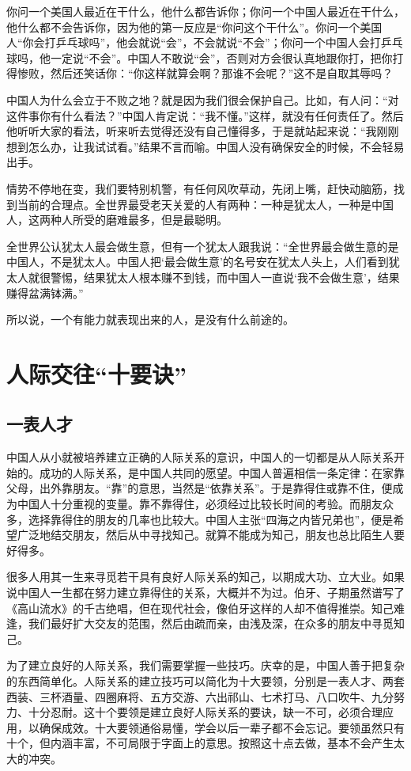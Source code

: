 \documentclass[fontset=fandol, a4paper, 12pt, openright]{ctexbook}
\begin{document}
你问一个美国人最近在干什么，他什么都告诉你；你问一个中国人最近在干什么，他什么都不会告诉你，因为他的第一反应是“你问这个干什么”。你问一个美国人“你会打乒乓球吗”，他会就说“会”，不会就说“不会”；你问一个中国人会打乒乓球吗，他一定说“不会”。中国人不敢说“会”，否则对方会很认真地跟你打，把你打得惨败，然后还笑话你：“你这样就算会啊？那谁不会呢？”这不是自取其辱吗？

中国人为什么会立于不败之地？就是因为我们很会保护自己。比如，有人问：“对这件事你有什么看法？”中国人肯定说：“我不懂。”这样，就没有任何责任了。然后他听听大家的看法，听来听去觉得还没有自己懂得多，于是就站起来说：“我刚刚想到怎么办，让我试试看。”结果不言而喻。中国人没有确保安全的时候，不会轻易出手。

情势不停地在变，我们要特别机警，有任何风吹草动，先闭上嘴，赶快动脑筋，找到当前的合理点。全世界最受老天关爱的人有两种：一种是犹太人，一种是中国人，这两种人所受的磨难最多，但是最聪明。

全世界公认犹太人最会做生意，但有一个犹太人跟我说：“全世界最会做生意的是中国人，不是犹太人。中国人把‘最会做生意’的名号安在犹太人头上，人们看到犹太人就很警惕，结果犹太人根本赚不到钱，而中国人一直说‘我不会做生意’，结果赚得盆满钵满。”

所以说，一个有能力就表现出来的人，是没有什么前途的。


\part{人际交往“十要诀”}

\chapter{一表人才}
中国人从小就被培养建立正确的人际关系的意识，中国人的一切都是从人际关系开始的。成功的人际关系，是中国人共同的愿望。中国人普遍相信一条定律：在家靠父母，出外靠朋友。“靠”的意思，当然是“依靠关系”。于是靠得住或靠不住，便成为中国人十分重视的变量。靠不靠得住，必须经过比较长时间的考验。而朋友众多，选择靠得住的朋友的几率也比较大。中国人主张“四海之内皆兄弟也”，便是希望广泛地结交朋友，然后从中寻找知己。就算不能成为知己，朋友也总比陌生人要好得多。

很多人用其一生来寻觅若干具有良好人际关系的知己，以期成大功、立大业。如果说中国人一生都在努力建立靠得住的关系，大概并不为过。伯牙、子期虽然谱写了《高山流水》的千古绝唱，但在现代社会，像伯牙这样的人却不值得推崇。知己难逢，我们最好扩大交友的范围，然后由疏而亲，由浅及深，在众多的朋友中寻觅知己。

为了建立良好的人际关系，我们需要掌握一些技巧。庆幸的是，中国人善于把复杂的东西简单化。人际关系的建立技巧可以简化为十大要领，分别是一表人才、两套西装、三杯酒量、四圈麻将、五方交游、六出祁山、七术打马、八口吹牛、九分努力、十分忍耐。这十个要领是建立良好人际关系的要诀，缺一不可，必须合理应用，以确保成效。十大要领通俗易懂，学会以后一辈子都不会忘记。要领虽然只有十个，但内涵丰富，不可局限于字面上的意思。按照这十点去做，基本不会产生太大的冲突。
\end{document}
